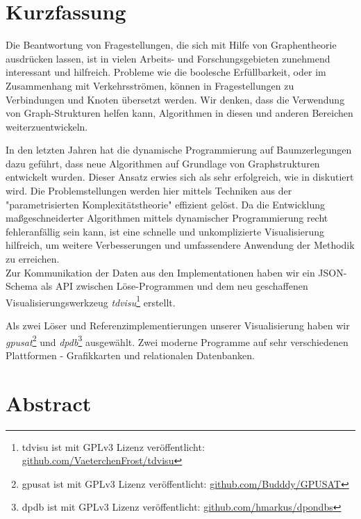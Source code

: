 \documentclass[a4paper, 12pt, bibliography=totoc]{scrartcl}
\begin{document}
\section*{Kurzfassung}

\vspace{4ex}

Die Beantwortung von Fragestellungen, die sich mit Hilfe von Graphentheorie ausdrücken lassen, ist in vielen Arbeits- und Forschungsgebieten zunehmend interessant und hilfreich.
Probleme wie die boolesche Erfüllbarkeit, oder im Zusammenhang mit Verkehrsströmen, können in Fragestellungen zu Verbindungen und Knoten übersetzt werden.
Wir denken, dass die Verwendung von Graph-Strukturen helfen kann, Algorithmen in diesen und anderen Bereichen weiterzuentwickeln.

In den letzten Jahren hat die dynamische Programmierung auf Baumzerlegungen dazu geführt, dass neue Algorithmen auf Grundlage von Graphstrukturen entwickelt wurden. Dieser Ansatz erwies sich als sehr erfolgreich, wie in \cite{fichtegpusat2} diskutiert wird. Die Problemstellungen werden hier mittels Techniken aus der "parametrisierten Komplexitätstheorie" \cite[S. 2]{dpdbpadl2020} effizient gelöst.
Da die Entwicklung maßgeschneiderter Algorithmen mittels dynamischer Programmierung recht fehleranfällig sein kann, ist eine schnelle und unkomplizierte Visualisierung hilfreich, um weitere Verbesserungen und umfassendere Anwendung der Methodik zu erreichen.\\

Zur Kommunikation der Daten aus den Implementationen
haben wir ein JSON-Schema als API zwischen Löse-Programmen und dem neu geschaffenen Visualisierungswerkzeug \textit{tdvisu}\footnote{tdvisu ist mit GPLv3 Lizenz veröffentlicht: \url{github.com/VaeterchenFrost/tdvisu}} erstellt.

Als zwei Löser und Referenzimplementierungen unserer Visualisierung haben wir \textit{gpusat}\footnote{gpusat ist mit GPLv3 Lizenz veröffentlicht: \url{github.com/Budddy/GPUSAT}} und \textit{dpdb}\footnote{dpdb ist mit GPLv3 Lizenz veröffentlicht: \url{github.com/hmarkus/dpondbs}} ausgewählt. Zwei moderne Programme auf sehr verschiedenen Plattformen - Grafikkarten und relationalen Datenbanken.\\


\newpage
\section*{Abstract}

\vspace{4ex}
\end{document}
